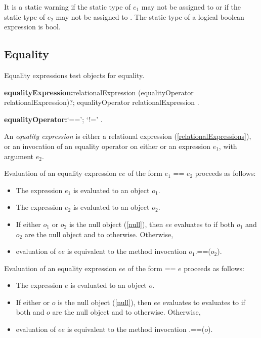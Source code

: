 \documentclass{article}
\newcommand{\code}[1]{{\sf #1}}
\begin{document}
\LMHash{}
It is a static warning if the static type of $e_1$ may not be assigned to  or if the static type of $e_2$ may not be assigned to . The static type of a logical boolean expression is \code{bool}.


 \subsection{ Equality}

\LMHash{}
Equality expressions test objects for equality.

 \begin{grammar}
{\bf equalityExpression:}relationalExpression (equalityOperator relationalExpression)?;
      \SUPER{} equalityOperator relationalExpression
    .

{\bf equalityOperator:}`==';
      `!='
    .
 \end{grammar}

\LMHash{}
An {\em equality expression} is either a relational expression (\ref{relationalExpressions}), or an invocation of an equality operator on either \SUPER{} or an expression $e_1$, with argument $e_2$.


\LMHash{}
Evaluation of an equality expression $ee$ of the form \code{$e_1$ == $e_2$} proceeds as follows:
\begin{itemize}
\item The expression $e_1$ is evaluated to an object $o_1$.
\item The expression $e_2$ is evaluated to an object $o_2$.
\item If either $o_1$ or $o_2$ is the null object (\ref{null}), then $ee$ evaluates to \TRUE{} if both $o_1$ and $o_2$ are the null object and to \FALSE{} otherwise.  Otherwise,
\item evaluation of $ee$ is equivalent to the method invocation \code{$o_1$.==($o_2$)}.
\end{itemize}


\LMHash{}
Evaluation of an equality expression $ee$ of the form \code{\SUPER{} == $e$} proceeds as follows:
\begin{itemize}
\item The expression $e$ is evaluated to an object $o$.
\item If either \THIS{} or $o$ is the null object (\ref{null}), then $ee$ evaluates to evaluates to \TRUE{} if both \THIS{} and $o$ are the null object and to \FALSE{} otherwise. Otherwise,
\item evaluation of $ee$ is equivalent to the method invocation \code{\SUPER{}.==($o$)}.
\end{itemize}
\end{document}
